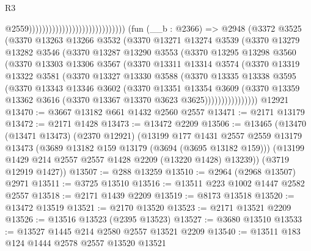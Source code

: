 \begin{lexlean}{R3}
\begin{coremodule}
                                                              @2559)))))))))))))))))))))))))))))
    (fun (__b : @2366) =>
    @2948
      (@3372
        @3525
        (@3370
          @13263
          @13266
          @3532
          (@3370
            @13271
            @13274
            @3539
            (@3370
              @13279
              @13282
              @3546
              (@3370
                @13287
                @13290
                @3553
                (@3370
                  @13295
                  @13298
                  @3560
                  (@3370
                    @13303
                    @13306
                    @3567
                    (@3370
                      @13311
                      @13314
                      @3574
                      (@3370
                        @13319
                        @13322
                        @3581
                        (@3370
                          @13327
                          @13330
                          @3588
                          (@3370
                            @13335
                            @13338
                            @3595
                            (@3370
                              @13343
                              @13346
                              @3602
                              (@3370
                                @13351
                                @13354
                                @3609
                                (@3370
                                  @13359
                                  @13362
                                  @3616
                                  (@3370 @13367 @13370 @3623 @3625))))))))))))))))
    @12921
@13470 := @3667 @13182 @661 @1432 @2560 @2557
@13471 := @2171 @13179
@13472 := @2171 @1428
@13473 := @13472 @2209
@13506 := @13465
    (@13470
      (@13471 @13473)
      (@2370 @12921)
      (@13199
        @177
        @1431
        @2557
        @2559
        @13179
        @13473
        (@3689 @13182 @159 @13179 (@3694 (@3695 @13182 @159)))
        (@13199 @1429 @214 @2557 @2557 @1428 @2209 (@13220 @1428) @13239))
      (@3719 @12919 @1427))
@13507 := @288 @13259
@13510 := @2964 (@2968 @13507) @2971
@13511 := @3725 @13510
@13516 := @13511 @223 @1002 @1447 @2582 @2557
@13518 := @2171 @1439 @2209
@13519 := @8173 @13518
@13520 := @13472 @13519
@13521 := @2170 @13520
@13523 := @2171 @13521 @2209
@13526 := @13516 @13523 (@2395 @13523)
@13527 := @3680 @13510
@13533 := @13527 @1445 @214 @2580 @2557 @13521 @2209
@13540 := @13511 @183 @124 @1444 @2578 @2557 @13520 @13521

\end{coremodule}
\end{lexlean}
